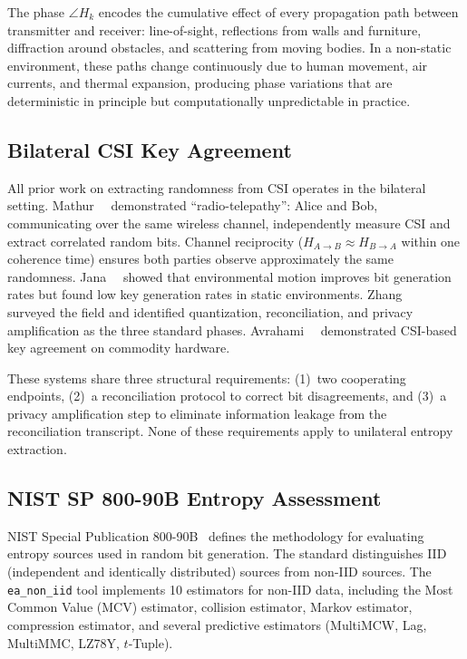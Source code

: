 The phase $\angle H_k$ encodes the cumulative effect of every propagation path between transmitter and receiver: line-of-sight, reflections from walls and furniture, diffraction around obstacles, and scattering from moving bodies.
In a non-static environment, these paths change continuously due to human movement, air currents, and thermal expansion, producing phase variations that are deterministic in principle but computationally unpredictable in practice.

\subsection{Bilateral CSI Key Agreement}
\label{subsec:bilateral}

All prior work on extracting randomness from CSI operates in the bilateral setting.
Mathur~\etal~\cite{mathur2008radio} demonstrated ``radio-telepathy'': Alice and Bob, communicating over the same wireless channel, independently measure CSI and extract correlated random bits.
Channel reciprocity ($H_{A \to B} \approx H_{B \to A}$ within one coherence time) ensures both parties observe approximately the same randomness.
Jana~\etal~\cite{jana2009effectiveness} showed that environmental motion improves bit generation rates but found low key generation rates in static environments.
Zhang~\etal~\cite{zhang2016csikey} surveyed the field and identified quantization, reconciliation, and privacy amplification as the three standard phases.
Avrahami~\etal~\cite{avrahami2023csi} demonstrated CSI-based key agreement on commodity hardware.

These systems share three structural requirements: (1)~two cooperating endpoints, (2)~a reconciliation protocol to correct bit disagreements, and (3)~a privacy amplification step to eliminate information leakage from the reconciliation transcript.
None of these requirements apply to unilateral entropy extraction.

\subsection{NIST SP 800-90B Entropy Assessment}
\label{subsec:sp800-90b}

NIST Special Publication 800-90B~\cite{nist2018sp80090b} defines the methodology for evaluating entropy sources used in random bit generation.
The standard distinguishes IID (independent and identically distributed) sources from non-IID sources.
The \texttt{ea\_non\_iid} tool implements 10 estimators for non-IID data, including the Most Common Value (MCV) estimator, collision estimator, Markov estimator, compression estimator, and several predictive estimators (MultiMCW, Lag, MultiMMC, LZ78Y, $t$-Tuple).

